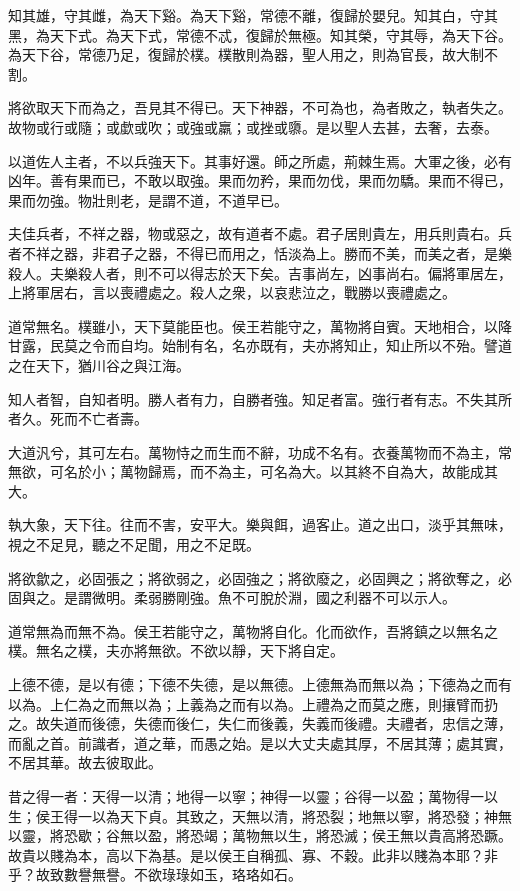 \begin{pinyinscope}
知其雄，守其雌，為天下谿。為天下谿，常德不離，復歸於嬰兒。知其白，守其黑，為天下式。為天下式，常德不忒，復歸於無極。知其榮，守其辱，為天下谷。為天下谷，常德乃足，復歸於樸。樸散則為器，聖人用之，則為官長，故大制不割。

將欲取天下而為之，吾見其不得已。天下神器，不可為也，為者敗之，執者失之。故物或行或隨；或歔或吹；或強或羸；或挫或隳。是以聖人去甚，去奢，去泰。

以道佐人主者，不以兵強天下。其事好還。師之所處，荊棘生焉。大軍之後，必有凶年。善有果而已，不敢以取強。果而勿矜，果而勿伐，果而勿驕。果而不得已，果而勿強。物壯則老，是謂不道，不道早已。

夫佳兵者，不祥之器，物或惡之，故有道者不處。君子居則貴左，用兵則貴右。兵者不祥之器，非君子之器，不得已而用之，恬淡為上。勝而不美，而美之者，是樂殺人。夫樂殺人者，則不可以得志於天下矣。吉事尚左，凶事尚右。偏將軍居左，上將軍居右，言以喪禮處之。殺人之衆，以哀悲泣之，戰勝以喪禮處之。

道常無名。樸雖小，天下莫能臣也。侯王若能守之，萬物將自賓。天地相合，以降甘露，民莫之令而自均。始制有名，名亦既有，夫亦將知止，知止所以不殆。譬道之在天下，猶川谷之與江海。

知人者智，自知者明。勝人者有力，自勝者強。知足者富。強行者有志。不失其所者久。死而不亡者壽。

大道汎兮，其可左右。萬物恃之而生而不辭，功成不名有。衣養萬物而不為主，常無欲，可名於小；萬物歸焉，而不為主，可名為大。以其終不自為大，故能成其大。

執大象，天下往。往而不害，安平大。樂與餌，過客止。道之出口，淡乎其無味，視之不足見，聽之不足聞，用之不足既。

將欲歙之，必固張之；將欲弱之，必固強之；將欲廢之，必固興之；將欲奪之，必固與之。是謂微明。柔弱勝剛強。魚不可脫於淵，國之利器不可以示人。

道常無為而無不為。侯王若能守之，萬物將自化。化而欲作，吾將鎮之以無名之樸。無名之樸，夫亦將無欲。不欲以靜，天下將自定。

上德不德，是以有德；下德不失德，是以無德。上德無為而無以為；下德為之而有以為。上仁為之而無以為；上義為之而有以為。上禮為之而莫之應，則攘臂而扔之。故失道而後德，失德而後仁，失仁而後義，失義而後禮。夫禮者，忠信之薄，而亂之首。前識者，道之華，而愚之始。是以大丈夫處其厚，不居其薄；處其實，不居其華。故去彼取此。

昔之得一者：天得一以清；地得一以寧；神得一以靈；谷得一以盈；萬物得一以生；侯王得一以為天下貞。其致之，天無以清，將恐裂；地無以寧，將恐發；神無以靈，將恐歇；谷無以盈，將恐竭；萬物無以生，將恐滅；侯王無以貴高將恐蹶。故貴以賤為本，高以下為基。是以侯王自稱孤、寡、不穀。此非以賤為本耶？非乎？故致數譽無譽。不欲琭琭如玉，珞珞如石。


\end{pinyinscope}
